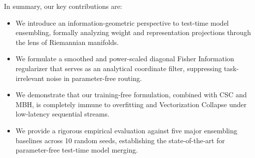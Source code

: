 In summary, our key contributions are:
\begin{itemize}\setlength{\itemsep}{0.5pt}\setlength{\parskip}{0pt}
    \item We introduce an information-geometric perspective to test-time model ensembling, formally analyzing weight and representation projections through the lens of Riemannian manifolds.
    \item We formulate a smoothed and power-scaled diagonal Fisher Information regularizer that serves as an analytical coordinate filter, suppressing task-irrelevant noise in parameter-free routing.
    \item We demonstrate that our training-free formulation, combined with CSC and MBH, is completely immune to overfitting and Vectorization Collapse under low-latency sequential streams.
    \item We provide a rigorous empirical evaluation against five major ensembling baselines across 10 random seeds, establishing the state-of-the-art for parameter-free test-time model merging.
\end{itemize}
